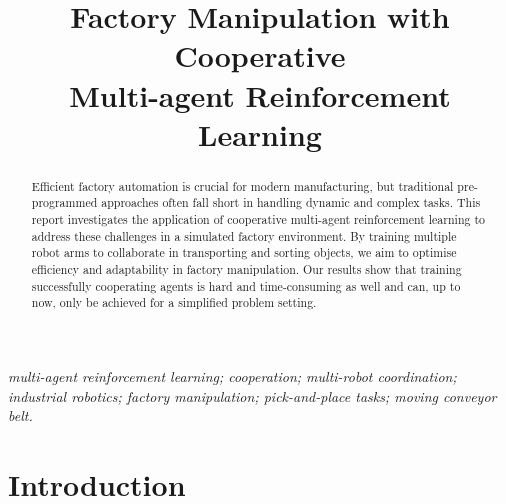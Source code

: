 \documentclass[conference,a4paper]{IEEEtran}
\begin{document}
\renewcommand*{\ttdefault}{cmvtt}

\title{Factory Manipulation with Cooperative\\ Multi-agent Reinforcement Learning\\
{\footnotesize }
}

\author{
\and
{}
}

\maketitle

\begin{abstract}
Efficient factory automation is crucial for modern manufacturing, but traditional pre-programmed approaches often fall short in handling dynamic and complex tasks. This report investigates the application of cooperative multi-agent reinforcement learning to address these challenges in a simulated factory environment. By training multiple robot arms to collaborate in transporting and sorting objects, we aim to optimise efficiency and adaptability in factory manipulation. Our results show that training successfully cooperating agents is hard and time-consuming as well and can, up to now, only be achieved for a simplified problem setting.
\end{abstract}

\vspace{1em}
\def\IEEEkeywordsname{Keywords}

\begin{IEEEkeywords} \itshape
multi-agent reinforcement learning;
cooperation;
multi-robot coordination;
industrial robotics;
factory manipulation;
pick-and-place tasks;
moving conveyor belt.
\end{IEEEkeywords}





\section{Introduction}
\end{document}
